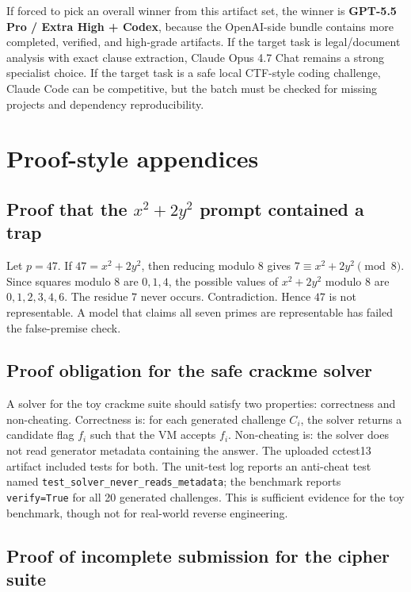 \documentclass[11pt]{article}
\begin{document}
If forced to pick an overall winner from this artifact set, the winner is \textbf{GPT-5.5 Pro / Extra High + Codex}, because the OpenAI-side bundle contains more completed, verified, and high-grade artifacts. If the target task is legal/document analysis with exact clause extraction, Claude Opus 4.7 Chat remains a strong specialist choice. If the target task is a safe local CTF-style coding challenge, Claude Code can be competitive, but the batch must be checked for missing projects and dependency reproducibility.

\section{Proof-style appendices}

\subsection{Proof that the \texorpdfstring{$x^2+2y^2$}{x-squared plus 2 y-squared} prompt contained a trap}

Let $p=47$. If $47=x^2+2y^2$, then reducing modulo $8$ gives $7\equiv x^2+2y^2\pmod 8$. Since squares modulo $8$ are $0,1,4$, the possible values of $x^2+2y^2$ modulo $8$ are $0,1,2,3,4,6$. The residue $7$ never occurs. Contradiction. Hence $47$ is not representable. A model that claims all seven primes are representable has failed the false-premise check.

\subsection{Proof obligation for the safe crackme solver}

A solver for the toy crackme suite should satisfy two properties: correctness and non-cheating. Correctness is: for each generated challenge $C_i$, the solver returns a candidate flag $f_i$ such that the VM accepts $f_i$. Non-cheating is: the solver does not read generator metadata containing the answer. The uploaded cctest13 artifact included tests for both. The unit-test log reports an anti-cheat test named \texttt{test\_solver\_never\_reads\_metadata}; the benchmark reports \texttt{verify=True} for all 20 generated challenges. This is sufficient evidence for the toy benchmark, though not for real-world reverse engineering.

\subsection{Proof of incomplete submission for the cipher suite}
\end{document}

